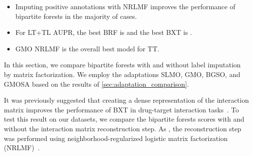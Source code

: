 \begin{mdframed}[frametitle={Key findings}]
    \begin{itemize}
        \item Imputing positive annotations with NRLMF improves the performance of bipartite forests in the majority of cases.
        \item For LT+TL AUPR, the best BRF is  and the best BXT is .
        \item GMO NRLMF is the overall best model for TT.
    \end{itemize}
\end{mdframed}

In this section, we compare bipartite forests with and without label imputation by matrix factorization. We employ the adaptations SLMO, GMO, BGSO, and GMOSA based on the results of \autoref{sec:adaptation_comparison}.

It was previously suggested that creating a dense representation of the interaction matrix improves the performance of BXT in drug-target interaction tasks~\cite{pliakos2020drugtarget}.
To test this result on our datasets, we compare the bipartite forests scores with and without the interaction matrix reconstruction step. As \cite{pliakos2020drugtarget}, the reconstruction step was performed using neighborhood-regularized logistic matrix factorization (NRLMF)~\cite{liu2016neighborhood}.

